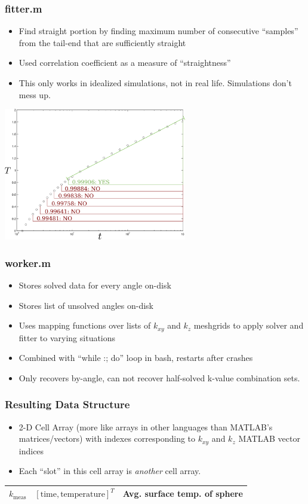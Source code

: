 \documentclass{beamer}
\begin{document}
\begin{frame}
\frametitle{fitter.m}
\begin{itemize}
\item Find straight portion by finding maximum number of consecutive ``samples''
from the tail-end that are sufficiently straight
\item Used correlation coefficient as a measure of ``straightness''
\item This only works in idealized simulations, not in real life. Simulations don't mess up.
\end{itemize}
\begin{center}
\includegraphics[width=0.6\textwidth]{fig/curvefit.png}
\end{center}
\end{frame}


\begin{frame}
\frametitle{worker.m}
\begin{itemize}
\item Stores solved data for every angle on-disk
\item Stores list of unsolved angles on-disk
\item Uses mapping functions over lists of \(k_{xy}\) and \(k_z\) meshgrids to
apply solver and fitter to varying situations
\item Combined with ``while :; do'' loop in bash, restarts after crashes
\item Only recovers by-angle, can not recover half-solved k-value combination sets.
\end{itemize}
\end{frame}


\begin{frame}
\frametitle{Resulting Data Structure}
\begin{itemize}
\item 2-D Cell Array (more like arrays in other languages than MATLAB's matrices/vectors) with indexes corresponding to \(k_{xy}\) and \(k_z\) MATLAB vector indices
\item Each ``slot'' in this cell array is \emph{another} cell array.
\end{itemize}
\begin{table}
\begin{tabular}{| c | c | c |}
\hline
\(k_\textrm{meas}\) & \( \left[ \textrm{time}, \textrm{temperature} \right]^T\) & Avg. surface temp. of sphere\\
\hline
\end{tabular}
\end{table}
\end{frame}
\end{document}
